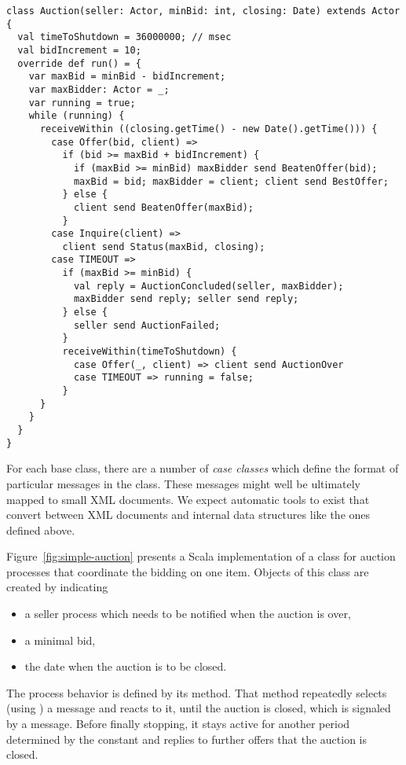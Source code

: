 \begin{lstlisting}[style=floating,label=fig:simple-auction,caption=Implementation of an Auction Service]
class Auction(seller: Actor, minBid: int, closing: Date) extends Actor {
  val timeToShutdown = 36000000; // msec
  val bidIncrement = 10;
  override def run() = {
    var maxBid = minBid - bidIncrement;
    var maxBidder: Actor = _;
    var running = true;
    while (running) {
      receiveWithin ((closing.getTime() - new Date().getTime())) {
        case Offer(bid, client) =>
          if (bid >= maxBid + bidIncrement) { 
            if (maxBid >= minBid) maxBidder send BeatenOffer(bid);
            maxBid = bid; maxBidder = client; client send BestOffer;
          } else {
            client send BeatenOffer(maxBid);
          }
        case Inquire(client) =>
          client send Status(maxBid, closing);
        case TIMEOUT =>
          if (maxBid >= minBid) {
            val reply = AuctionConcluded(seller, maxBidder);
            maxBidder send reply; seller send reply;
          } else {
            seller send AuctionFailed;
          }
          receiveWithin(timeToShutdown) {
            case Offer(_, client) => client send AuctionOver
            case TIMEOUT => running = false;
          }
      }
    }
  } 
}
\end{lstlisting}

For each base class, there are a number of {\em case classes} which
define the format of particular messages in the class. These messages
might well be ultimately mapped to small XML documents. We expect
automatic tools to exist that convert between XML documents and
internal data structures like the ones defined above.

Figure~\ref{fig:simple-auction} presents a Scala implementation of a
class  for auction processes that coordinate the bidding
on one item. Objects of this class are created by indicating
\begin{itemize}
\item a seller process which needs to be notified when the auction is over,
\item a minimal bid,
\item the date when the auction is to be closed.
\end{itemize}
The process behavior is defined by its  method. That method
repeatedly selects (using ) a message and reacts to it,
until the auction is closed, which is signaled by a 
message. Before finally stopping, it stays active for another period
determined by the  constant and replies to
further offers that the auction is closed.  


